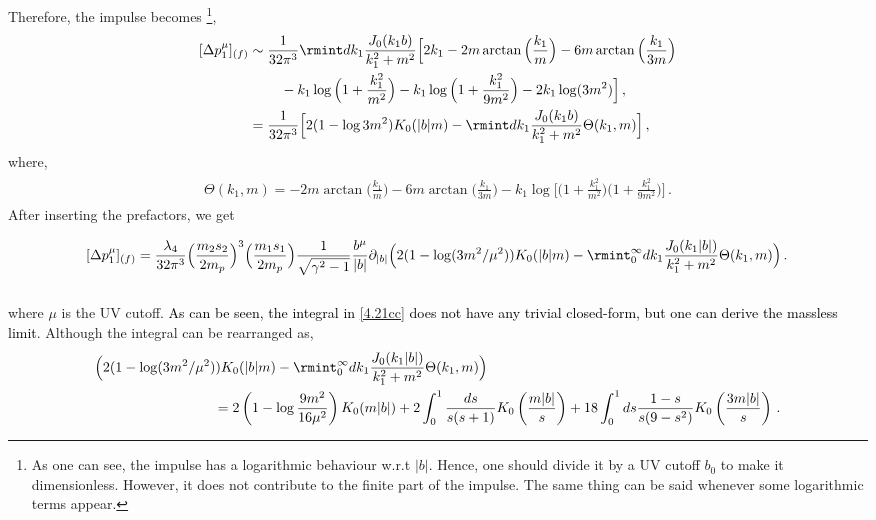 Therefore, the impulse becomes \footnote{As one can see, the impulse has a logarithmic behaviour w.r.t $|b|$. Hence, one should divide it by a UV cutoff $b_0$ to make it dimensionless. However, it does not contribute to the finite part of the impulse. The same thing can be said whenever some logarithmic terms appear. },
\begin{align}
    \begin{split}
         [\Delta p_1^{\mu}]_{(f)}&\sim \frac{1}{32\pi^3}\rmint dk_1\frac{J_{0}(k_1b)}{k_1^2+m^2}\Big[2k_1-2m\arctan\Big(\frac{k_1}{m}\Big)-6m\arctan\Big(\frac{k_1}{3m}\Big)\\ &
        \hspace{0.8cm}-k_1\log\Big(1+\frac{k_1^2}{m^2}\Big)-k_1\log\Big(1+\frac{k_1^2}{9m^2}\Big)-2k_1 \log(3m^2)\Big]\,,\\ &
        =\frac{1}{32\pi^3}\Big[2(1-\log3m^2)K_{0}(|b|m)-\rmint dk_1\frac{J_{0}(k_1 b)}{k_1^2+m^2}\Theta(k_1,m)\Big]\,,
    \end{split}
\end{align}
where,
\begin{align}
    \begin{split}
        \Theta(k_1,m)=-2m\arctan\Big(\frac{k_1}{m}\Big)-6m\arctan\Big(\frac{k_1}{3m}\Big)-k_1 \log\Big[\Big(1+\frac{k_1^2}{m^2}\Big)\Big(1+\frac{k_1^2}{9m^2}\Big)\Big]\,.
    \end{split}
\end{align}
After inserting the prefactors, we get

%

\begin{equation}\label{e:barwq246}
 [\Delta p_1^{\mu}]_{(f)}=\frac{\lambda_4}{32\pi^3} \Big(\frac{m_2 s_2}{2m_p}\Big)^3\Big(\frac{m_1 s_1}{2m_p }\Big)\frac{1}{\sqrt{\gamma^2-1}}\frac{b^\mu}{|b|}\partial_{|b|}\Big(2(1-\log(3m^2/\mu^2))K_{0}(|b|m)-\rmint_0^{\infty} dk_1\frac{J_{0}(k_1 |b|)}{k_1^2+m^2}\Theta(k_1,m)\Big)\,.\,
\end{equation}\\
where $\mu$ is the UV cutoff.\textcolor{black}{ As can be seen, the integral in \eqref{4.21cc} does not have any trivial closed-form, but one can derive the massless limit}. Although the integral can be rearranged as,
\begin{align}
   \begin{split}
   & \Big(2(1-\log(3m^2/\mu^2))K_{0}(|b|m)-\rmint_0^{\infty} dk_1\frac{J_{0}(k_1 |b|)}{k_1^2+m^2}\Theta(k_1,m)\Big)\\ &
   \hspace{3 cm}=2\left(1-\log\frac{9m^2}{16\mu^2}\right)K_0(m|b|)+2\int_{0}^1 \frac{ds}{s(s+1)}K_0\left(\frac{m|b|}{s}\right)+18 \int_0^1 ds \frac{1-s}{s(9-s^2)}K_0\left(\frac{3m|b|}{s}\right)\,.
    \end{split}
\end{align}

